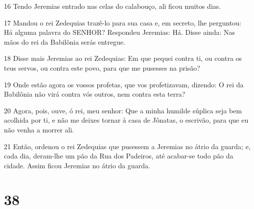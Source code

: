 \par 16 Tendo Jeremias entrado nas celas do calabouço, ali ficou muitos dias.
\par 17 Mandou o rei Zedequias trazê-lo para sua casa e, em secreto, lhe perguntou: Há alguma palavra do SENHOR? Respondeu Jeremias: Há. Disse ainda: Nas mãos do rei da Babilônia serás entregue.
\par 18 Disse mais Jeremias ao rei Zedequias: Em que pequei contra ti, ou contra os teus servos, ou contra este povo, para que me pusesses na prisão?
\par 19 Onde estão agora os vossos profetas, que vos profetizavam, dizendo: O rei da Babilônia não virá contra vós outros, nem contra esta terra?
\par 20 Agora, pois, ouve, ó rei, meu senhor: Que a minha humilde súplica seja bem acolhida por ti, e não me deixes tornar à casa de Jônatas, o escrivão, para que eu não venha a morrer ali.
\par 21 Então, ordenou o rei Zedequias que pusessem a Jeremias no átrio da guarda; e, cada dia, deram-lhe um pão da Rua dos Padeiros, até acabar-se todo pão da cidade. Assim ficou Jeremias no átrio da guarda.

\chapter{38}

